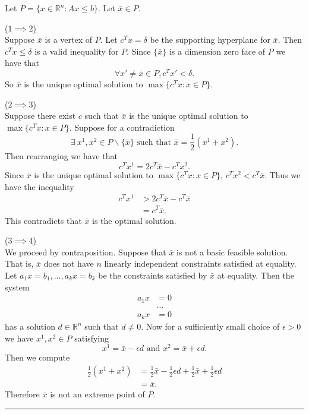 \documentclass[11pt]{article}
\newenvironment{proof}{{\bf Proof:  }}{\hfill\rule{2mm}{2mm}}
\newcommand{\R}{\ensuremath{\mathbb R}}
\begin{document}
\begin{proof}
Let $P = \{x \in \R^n : Ax \leq b\}$. Let $\bar{x} \in P$.

\underline{\noindent ($1\implies 2$)}\\
Suppose $\bar{x}$ is a vertex of $P$.  Let $c^Tx = \delta$ be the supporting hyperplane for $\bar{x}$. Then $c^Tx \leq \delta$ is a valid inequality for $P$. Since $\{\bar{x}\}$ is a dimension zero face of $P$ we have that $$\forall x'\neq \bar{x} \in P, c^Tx' < \delta.$$
So $\bar{x}$ is the unique optimal solution to $\max\{c^Tx : x \in P \}$.

\underline{\noindent ($2 \implies 3$)}\\
Suppose there exist $c$ such that $\bar{x}$ is the unique optimal solution to $\max\{c^Tx : x \in P\}$. Suppose for a contradiction 
$$\exists\ x^1, x^2 \in P \backslash \{\bar{x}\} \text{ such that }\bar{x} = \frac{1}{2}(x^1 + x^2).$$
Then rearranging we have that 
$$c^Tx^1 = 2c^T\bar{x} - c^Tx^2.$$
Since $\bar{x}$ is the unique optimal solution to $\max\{c^Tx : x \in P\}$, $c^Tx^2 < c^T\bar{x}$. Thus we have the inequality
\begin{align*}
c^Tx^1 &> 2c^T\bar{x} - c^T\bar{x} \\
&= c^T\bar{x}.
\end{align*}
This contradicts that $\bar{x}$ is the optimal solution.

\underline{\noindent ($3 \implies 4$)} \\
We proceed by contraposition. Suppose that $\bar{x}$ is not a basic feasible solution. That is, $\bar{x}$ does not have $n$ linearly independent constraints satisfied at equality. Let $a_1 x = b_1,\dots, a_k x = b_k$ be the constraints satisfied by $\bar{x}$ at equality. Then the system
\begin{align*}
a_1 x &= 0 \\
&\dots \\
a_k x &= 0
\end{align*}
has a solution $d \in \R^n$ such that $d \neq 0$. Now for a sufficiently small choice of $\epsilon > 0$ we have $x^1, x^2 \in P$ satisfying
$$ x^1 = \bar{x} - \epsilon d \text{ and } x^2 = \bar{x} + \epsilon d. $$
Then we compute
\begin{align*}
\frac{1}{2}(x^1 + x^2) &= \frac{1}{2}\bar{x} - \frac{1}{2}\epsilon d + \frac{1}{2}\bar{x} + \frac{1}{2}\epsilon d \\
&= \bar{x}.
\end{align*}
Therefore $\bar{x}$ is not an extreme point of $P$.


\end{proof}
\end{document}
